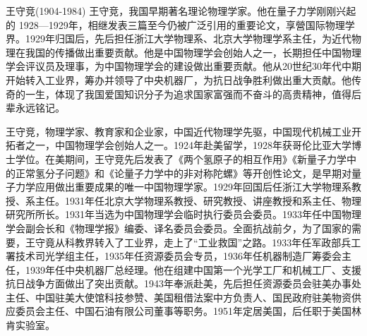 王守竞(1904-1984)
王守竞，我国早期著名理论物理学家。他在量子力学刚刚兴起的 1928—1929年，相继发表三篇至今仍被广泛引用的重要论文，享營国际物理学界。1929年归国后，先后担任浙江大学物理系、北京大学物理学系主任，为近代物理在我国的传播做出重要贡献。他是中国物理学会创始人之一，长期担任中国物理学会评议员及理事，为中国物理学会的建设做出重要贡献。他从20世纪30年代中期开始转入工业界，筹办并领导了中央机器厂，为抗日战争胜利做出重大贡献。他传奇的一生，体现了我国爱国知识分子为追求国家富强而不奋斗的高贵精神，值得后辈永远铭记。

王守竞，物理学家、教育家和企业家，中国近代物理学先驱，中国现代机械工业开拓者之一，中国物理学会创始人之一。1924年赴美留学，1928年获哥伦比亚大学博士学位。在美期间，王守竞先后发表了《两个氢原子的相互作用》《新量子力学中的正常氢分子问题》和《论量子力学中的非对称陀螺》等开创性论文，是早期对量子力学应用做出重要成果的唯一中国物理学家。1929年回国后任浙江大学物理系教授、系主任。1931年任北京大学物理系教授、研究教授、讲座教授和系主任、物理研究所所长。1931年当选为中国物理学会临时执行委员会委员。1933年任中国物理学会副会长和《物理学报》编委、译名委员会委员。全面抗战前夕，为了国家的需要，王守竟从科教界转入了工业界，走上了“工业救国”之路。1933年任军政部兵工署技术司光学组主任，1935年任资源委员会专员，1936年任机器制造厂筹委会主任，1939年任中央机器厂总经理。他在组建中国第一个光学工厂和机械工厂、支援抗日战争方面做出了突出贡献。1943年奉派赴美，先后担任资源委员会驻美办事处主任、中国驻美大使馆科技参赞、美国租借法案中方负责人、国民政府驻美物资供应委员会主任、中国石油有限公司董事等职务。1951年定居美国，后任职于美国林肯实验室。

